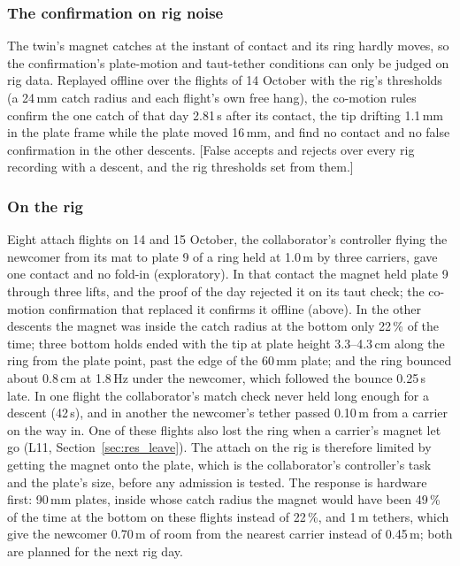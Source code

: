 \subsubsection{The confirmation on rig noise}

The twin's magnet catches at the instant of contact and its ring hardly moves, so the confirmation's plate-motion and
taut-tether conditions can only be judged on rig data. Replayed offline over the flights of 14 October with the rig's
thresholds (a 24\,mm catch radius and each flight's own free hang), the co-motion rules confirm the one catch of that
day 2.81\,s after its contact, the tip drifting 1.1\,mm in the plate frame while the plate moved 16\,mm, and find no
contact and no false confirmation in the other descents. [False accepts and rejects over every rig recording with a
descent, and the rig thresholds set from them.]

\subsubsection{On the rig}
\label{sec:res_join_rig}

Eight attach flights on 14 and 15 October, the collaborator's controller flying the newcomer from its mat to plate 9
of a ring held at 1.0\,m by three carriers, gave one contact and no fold-in (exploratory). In that contact the magnet
held plate 9 through three lifts, and the proof of the day rejected it on its taut check; the co-motion confirmation
that replaced it confirms it offline (above). In the other descents the magnet was inside the catch radius at the
bottom only 22\,\% of the time; three bottom holds ended with the tip at plate height 3.3--4.3\,cm along the ring from
the plate point, past the edge of the 60\,mm plate; and the ring bounced about 0.8\,cm at 1.8\,Hz under the newcomer,
which followed the bounce 0.25\,s late. In one flight the collaborator's match check never held long enough for a
descent (42\,s), and in another the newcomer's tether passed 0.10\,m from a carrier on the way in. One of these flights
also lost the ring when a carrier's magnet let go (L11, Section~\ref{sec:res_leave}). The attach on the rig is
therefore limited by getting the magnet onto the plate, which is the collaborator's controller's task and the plate's
size, before any admission is tested. The response is hardware first: 90\,mm plates, inside whose catch radius the
magnet would have been 49\,\% of the time at the bottom on these flights instead of 22\,\%, and 1\,m tethers, which give
the newcomer 0.70\,m of room from the nearest carrier instead of 0.45\,m; both are planned for the next rig day.

